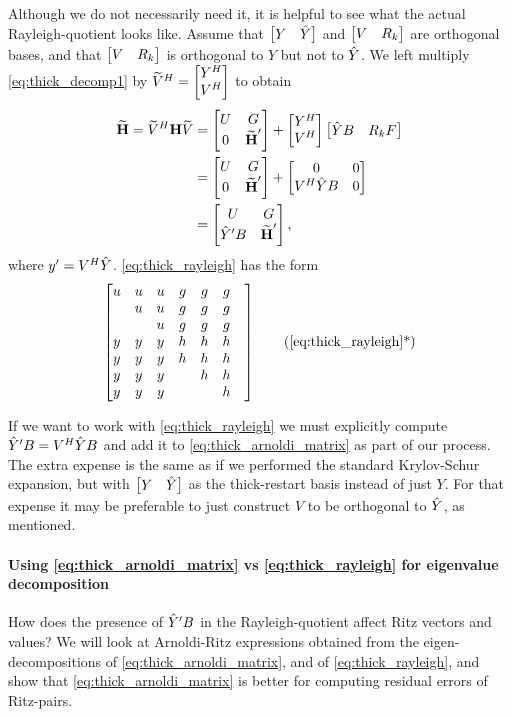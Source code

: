 Although we do not necessarily need it, it is helpful to see what the actual Rayleigh-quotient  looks like.  Assume that $\begin{bmatrix} Y&\hat{Y}\end{bmatrix}$ and $\begin{bmatrix} V&R_k\end{bmatrix}$ are orthogonal bases, and that $\begin{bmatrix} V& R_k\end{bmatrix}$ is orthogonal to $Y$ but not to $\hat{Y}$.   We left multiply \eqref{eq:thick_decomp1} by $\widetilde{V}^H = \begin{bmatrix} Y^H\\ V^H\end{bmatrix}$ to obtain
\begin{align}
\widetilde{\textbf{\textup{H}}}=\widetilde{V}^H \textbf{\textup{H}} \widetilde{V} &= \begin{bmatrix} U & G \\ 0&\widetilde{\textbf{\textup{H}}}^\prime\end{bmatrix} +    \begin{bmatrix} Y^H \\ V^H \end{bmatrix}\begin{bmatrix} \hat{Y} B  &  R_k F\end{bmatrix} \nonumber\\
&= \begin{bmatrix} U & G \\ 0&\widetilde{\textbf{\textup{H}}}^\prime\end{bmatrix} +\begin{bmatrix} 0&0\\ V^H\hat{Y} B&0\end{bmatrix}\nonumber\\
&= \begin{bmatrix} U & G \\ \hat{Y}^\prime B&\widetilde{\textbf{\textup{H}}}^\prime\end{bmatrix},
\label{eq:thick_rayleigh}
\end{align}
 where $y^\prime=V^H\hat{Y}$.  \eqref{eq:thick_rayleigh} has the form 
\begin{equation}
\mat{u&u&u&g&g&g\\%
        &u&u&g&g&g\\
	  &&u&g&g&g\\
	 y&y&y&h&h&h\\
	 y&y&y&h&h&h\\
	 y&y&y&&h&h\\
	y&y&y&&&h&
}
\tag{\ref{eq:thick_rayleigh}*}
\end{equation} 

 If we want to work with \eqref{eq:thick_rayleigh} we must explicitly compute  $\hat{Y}^\prime B= V^H\hat{Y} B$ and add it to \eqref{eq:thick_arnoldi_matrix} as part of our process.   The extra expense is the same as if we performed the standard Krylov-Schur expansion, but  with $\begin{bmatrix} Y & \hat{Y}\end{bmatrix}$ as the thick-restart basis instead of just $Y$. For that expense it may be preferable to just construct $V$ to be orthogonal to $\hat{Y}$, as mentioned.


\paragraph{Using \eqref{eq:thick_arnoldi_matrix} vs \eqref{eq:thick_rayleigh} for eigenvalue decomposition}
How does the presence of $\hat{Y}^\prime B$ in the Rayleigh-quotient affect Ritz vectors and values? We will look at Arnoldi-Ritz expressions obtained from the eigen-decompositions of \eqref{eq:thick_arnoldi_matrix}, and  of \eqref{eq:thick_rayleigh}, and show that \eqref{eq:thick_arnoldi_matrix} is better for computing residual errors of Ritz-pairs.


